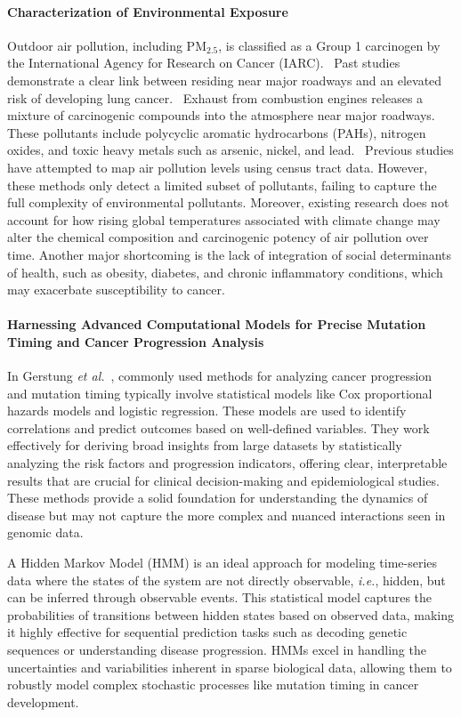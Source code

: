 \paragraph{Characterization of Environmental Exposure}
Outdoor air pollution, including PM$_{2.5}$, is classified as a Group 1 carcinogen by the International Agency for Research on Cancer (IARC).~\cite{gowda_ambient_2019} 
Past studies demonstrate a clear link between residing near major roadways and an elevated risk of developing lung cancer.~\cite{gowda_ambient_2019} 
Exhaust from combustion engines releases a mixture of carcinogenic compounds into the atmosphere near major roadways. 
These pollutants include polycyclic aromatic hydrocarbons (PAHs), nitrogen oxides, and toxic heavy metals such as arsenic, nickel, and lead.~\cite{yu_characterization_2015} 
Previous studies have attempted to map air pollution levels using census tract data.
However, these methods only detect a limited subset of pollutants, failing to capture the full complexity of environmental pollutants.
Moreover, existing research does not account for how rising global temperatures associated with climate change 
may alter the chemical composition and carcinogenic potency of air pollution over time. 
Another major shortcoming is the lack of integration of social determinants of health, 
such as obesity, diabetes, and chronic inflammatory conditions, which may exacerbate susceptibility to cancer.

\paragraph{Harnessing Advanced Computational Models for Precise Mutation Timing and Cancer Progression Analysis}
In Gerstung \textit{et al.}~\cite{gerstung_evolutionary_2020}, commonly used methods for analyzing cancer progression and mutation timing 
typically involve statistical models like Cox proportional hazards models and logistic regression. 
These models are used to identify correlations and predict outcomes based on well-defined variables. 
They work effectively for deriving broad insights from large datasets by statistically analyzing 
the risk factors and progression indicators, offering 
clear, interpretable results that are crucial for clinical decision-making and epidemiological studies. 
These methods provide a solid foundation for understanding the dynamics of disease but may not capture the 
more complex and nuanced interactions seen in genomic data.

A Hidden Markov Model (HMM) is an ideal approach for modeling time-series data where the states of the system are not directly observable, 
\textit{i.e.}, hidden, but can be inferred through observable events. 
This statistical model captures the probabilities of transitions between hidden states based on observed data, 
making it highly effective for sequential prediction tasks such as decoding genetic sequences or understanding disease progression. 
HMMs excel in handling the uncertainties and variabilities inherent in sparse biological data, 
allowing them to robustly model complex stochastic processes like mutation timing in cancer development.

